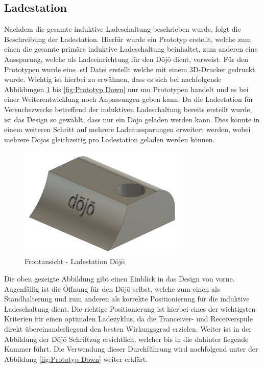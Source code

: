
\subsection{Ladestation} \label{sec:ladestation}

Nachdem die gesamte induktive Ladeschaltung beschrieben wurde, folgt die Beschreibung der Ladestation. Hierfür wurde ein Prototyp erstellt, welche zum einen die gesamte primäre induktive Ladeschaltung beinhaltet, zum anderen eine Aussparung, welche als Ladeeinrichtung für den Dōjō dient, vorweist. Für den Prototypen wurde eine .stl Datei erstellt welche mit einem 3D-Drucker gedruckt wurde. Wichtig ist hierbei zu erwähnen, dass es sich bei nachfolgende Abbildungen \ref{fig:Prototyp Front} bis \ref{fig:Prototyp Down} nur um Prototypen handelt und es bei einer Weiterentwicklung noch Anpassungen geben kann. Da die Ladestation für Versuchszwecke betreffend der induktiven Ladeschaltung bereits erstellt wurde, ist das Design so gewählt, dass nur ein Dōjō geladen werden kann. Dies könnte in einem weiteren Schritt auf mehrere Ladeaussparungen erweitert werden, wobei mehrere Dōjōs gleichzeitig pro Ladestation geladen werden können. 

\begin{figure}[H]
	\begin{center}
		\includegraphics[width=80mm]{data/DojoLadestation01.png}
		\caption[Prototyp Ladestation Frontansicht]{Frontansicht - Ladestation Dōjō} %
		\label{fig:Prototyp Front}
	\end{center}
\end{figure}

Die oben gezeigte Abbildung gibt einen Einblick in das Design von vorne. Augenfällig ist die Öffnung für den Dōjō selbst, welche zum einen als Standhalterung und zum anderen als korrekte Positionierung für die induktive Ladeschaltung dient. Die richtige Positionierung ist hierbei eines der wichtigsten Kriterien für einen optimalen Ladezyklus, da die Tranceiver- und Receiverspule direkt übereinanderliegend den besten Wirkungsgrad erzielen. Weiter ist in der Abbildung der Dōjō Schriftzug ersichtlich, welcher bis in die dahinter liegende Kammer führt. Die Verwendung dieser Durchführung wird nachfolgend unter der Abbildung \ref{fig:Prototyp Down} weiter erklärt. 


